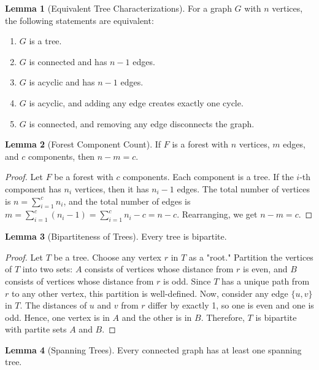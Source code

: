 \documentclass{article}
\theoremstyle{definition}
\newtheorem{lemma}{Lemma}
\begin{document}
\begin{lemma}[Equivalent Tree Characterizations]
For a graph $G$ with $n$ vertices, the following statements are equivalent:
\begin{enumerate}
    \item $G$ is a tree.
    \item $G$ is connected and has $n-1$ edges.
    \item $G$ is acyclic and has $n-1$ edges.
    \item $G$ is acyclic, and adding any edge creates exactly one cycle.
    \item $G$ is connected, and removing any edge disconnects the graph.
\end{enumerate}
\end{lemma}
\pagebreak

\begin{lemma}[Forest Component Count]
If $F$ is a forest with $n$ vertices, $m$ edges, and $c$ components, then $n - m = c$.
\end{lemma}

\begin{proof}
Let $F$ be a forest with $c$ components. Each component is a tree. If the $i$-th component has $n_i$ vertices, then it has $n_i - 1$ edges. The total number of vertices is $n = \sum_{i=1}^{c} n_i$, and the total number of edges is $m = \sum_{i=1}^{c} (n_i - 1) = \sum_{i=1}^{c} n_i - c = n - c$. Rearranging, we get $n - m = c$.
\end{proof}

\begin{lemma}[Bipartiteness of Trees]
Every tree is bipartite.
\end{lemma}

\begin{proof}
Let $T$ be a tree. Choose any vertex $r$ in $T$ as a "root." Partition the vertices of $T$ into two sets: $A$ consists of vertices whose distance from $r$ is even, and $B$ consists of vertices whose distance from $r$ is odd. Since $T$ has a unique path from $r$ to any other vertex, this partition is well-defined. Now, consider any edge $\{u, v\}$ in $T$. The distances of $u$ and $v$ from $r$ differ by exactly 1, so one is even and one is odd. Hence, one vertex is in $A$ and the other is in $B$. Therefore, $T$ is bipartite with partite sets $A$ and $B$.
\end{proof}

\begin{lemma}[Spanning Trees]
Every connected graph has at least one spanning tree.
\end{lemma}
\end{document}
